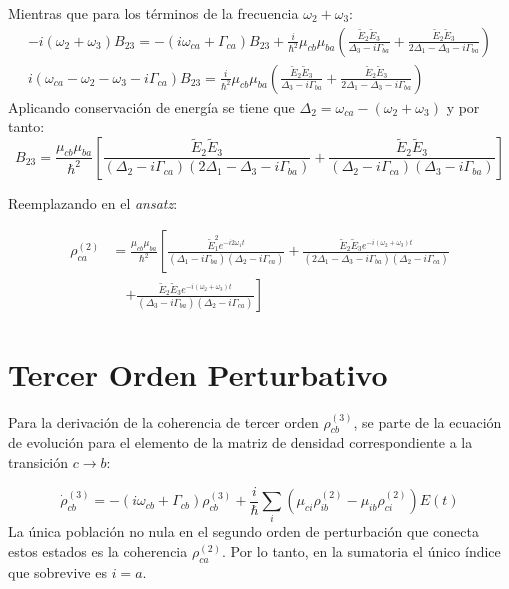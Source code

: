 \documentclass[12pt,a4paper]{article}
\begin{document}
Mientras que para los términos de la frecuencia $\omega_2 + \omega_3$: 
\begin{align}
    -i(\omega_2  + \omega_3)B_{23} = -(i\omega_{ca} + \Gamma_{ca})B_{23} + \frac{i}{\hbar^2}\mu_{cb}\mu_{ba}\left(\frac{\tilde{E}_2 \tilde{E}_3}{\Delta_3 - i\Gamma_{ba}} + \frac{\tilde{E}_2 \tilde{E}_3}{2\Delta_1 - \Delta_3 - i\Gamma_{ba}}\right)\\
    i(\omega_{ca} - \omega_2  - \omega_3 - i\Gamma_{ca})B_{23} = \frac{i}{\hbar^2}\mu_{cb}\mu_{ba}\left(\frac{\tilde{E}_2 \tilde{E}_3}{\Delta_3 - i\Gamma_{ba}} + \frac{\tilde{E}_2 \tilde{E}_3}{2\Delta_1 - \Delta_3 - i\Gamma_{ba}}\right)
\end{align}
Aplicando conservación de energía se tiene que $\Delta_2= \omega_{ca} - (\omega_2 + \omega_3)$ y por tanto:
\begin{equation}
B_{23} = \frac{\mu_{cb} \mu_{ba}}{\hbar^2} \left[ \frac{\tilde{E}_2 \tilde{E}_3}{(\Delta_2 - i\Gamma_{ca})(2\Delta_1 - \Delta_3 - i\Gamma_{ba})} + \frac{\tilde{E}_2 \tilde{E}_3}{(\Delta_2 - i\Gamma_{ca})(\Delta_3 - i\Gamma_{ba})} \right]
\end{equation}

Reemplazando en el \textit{ansatz}:

\begin{equation}
\begin{aligned}
\rho_{ca}^{(2)} &= \frac{\mu_{cb}\mu_{ba}}{\hbar^2} \left[ \frac{\tilde{E}_1^2 e^{-i2\omega_1 t}}{(\Delta_1 - i\Gamma_{ba})(\Delta_2 - i\Gamma_{ca})} \right. + \frac{\tilde{E}_2\tilde{E}_3 e^{-i(\omega_2+\omega_3)t}}{(2\Delta_1 - \Delta_3 - i\Gamma_{ba})(\Delta_2 - i\Gamma_{ca})} \\
&\quad \left. + \frac{\tilde{E}_2\tilde{E}_3 e^{-i(\omega_2+\omega_3)t}}{(\Delta_3 - i\Gamma_{ba})(\Delta_2 - i\Gamma_{ca})} \right]
\end{aligned} 
\end{equation}

\section{Tercer Orden Perturbativo}

Para la derivación de la coherencia de tercer orden $\rho_{cb}^{(3)}$, se parte de la ecuación de evolución para el elemento de la matriz de densidad correspondiente a la transición $c \to b$:

\begin{equation}
\dot{\rho}_{cb}^{(3)} = -(i\omega_{cb} + \Gamma_{cb})\rho_{cb}^{(3)} + \frac{i}{\hbar} \sum_i (\mu_{ci}\rho_{ib}^{(2)} - \mu_{ib}\rho_{ci}^{(2)})E(t)
\end{equation}
La única población no nula en el segundo orden de perturbación que conecta estos estados es la coherencia $\rho_{ca}^{(2)}$. Por lo tanto, en la sumatoria el único índice que sobrevive es $i=a$.
\end{document}
